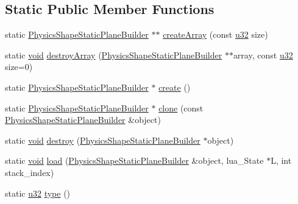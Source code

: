 \subsection*{Static Public Member Functions}
\begin{DoxyCompactItemize}
\item 
static \mbox{\hyperlink{classnjli_1_1_physics_shape_static_plane_builder}{Physics\+Shape\+Static\+Plane\+Builder}} $\ast$$\ast$ \mbox{\hyperlink{classnjli_1_1_physics_shape_static_plane_builder_a48f63630dda6cf518e2b069a7047da83}{create\+Array}} (const \mbox{\hyperlink{_util_8h_a10e94b422ef0c20dcdec20d31a1f5049}{u32}} size)
\item 
static \mbox{\hyperlink{_thread_8h_af1e856da2e658414cb2456cb6f7ebc66}{void}} \mbox{\hyperlink{classnjli_1_1_physics_shape_static_plane_builder_a386cb12ab6cf40799b5e92e19367ebcb}{destroy\+Array}} (\mbox{\hyperlink{classnjli_1_1_physics_shape_static_plane_builder}{Physics\+Shape\+Static\+Plane\+Builder}} $\ast$$\ast$array, const \mbox{\hyperlink{_util_8h_a10e94b422ef0c20dcdec20d31a1f5049}{u32}} size=0)
\item 
static \mbox{\hyperlink{classnjli_1_1_physics_shape_static_plane_builder}{Physics\+Shape\+Static\+Plane\+Builder}} $\ast$ \mbox{\hyperlink{classnjli_1_1_physics_shape_static_plane_builder_a1185296ae0e95774278d3d7483db32ff}{create}} ()
\item 
static \mbox{\hyperlink{classnjli_1_1_physics_shape_static_plane_builder}{Physics\+Shape\+Static\+Plane\+Builder}} $\ast$ \mbox{\hyperlink{classnjli_1_1_physics_shape_static_plane_builder_a5403d83289199a59928581d08195f4f0}{clone}} (const \mbox{\hyperlink{classnjli_1_1_physics_shape_static_plane_builder}{Physics\+Shape\+Static\+Plane\+Builder}} \&object)
\item 
static \mbox{\hyperlink{_thread_8h_af1e856da2e658414cb2456cb6f7ebc66}{void}} \mbox{\hyperlink{classnjli_1_1_physics_shape_static_plane_builder_ab47d6a0315188d9fab36ad76f752bead}{destroy}} (\mbox{\hyperlink{classnjli_1_1_physics_shape_static_plane_builder}{Physics\+Shape\+Static\+Plane\+Builder}} $\ast$object)
\item 
static \mbox{\hyperlink{_thread_8h_af1e856da2e658414cb2456cb6f7ebc66}{void}} \mbox{\hyperlink{classnjli_1_1_physics_shape_static_plane_builder_a3272650ed7517cde4581f5d802cfcbb3}{load}} (\mbox{\hyperlink{classnjli_1_1_physics_shape_static_plane_builder}{Physics\+Shape\+Static\+Plane\+Builder}} \&object, lua\+\_\+\+State $\ast$L, int stack\+\_\+index)
\item 
static \mbox{\hyperlink{_util_8h_a10e94b422ef0c20dcdec20d31a1f5049}{u32}} \mbox{\hyperlink{classnjli_1_1_physics_shape_static_plane_builder_afb58bbdb11a4a8435aee1d2b03ee63e5}{type}} ()
\end{DoxyCompactItemize}
